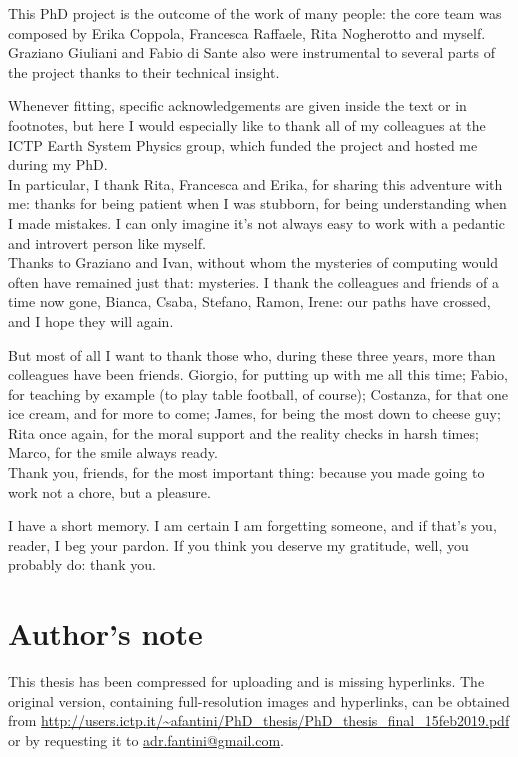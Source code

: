 \begin{acknowledgements}
\addchaptertocentry{\acknowledgementname} %
This PhD project is the outcome of the work of many people: the core team was composed by Erika Coppola, Francesca Raffaele, Rita Nogherotto and myself. Graziano Giuliani and Fabio di Sante also were instrumental to several parts of the project thanks to their technical insight. 

Whenever fitting, specific acknowledgements are given inside the text or in footnotes, but here I would especially like to thank all of my colleagues at the ICTP Earth System Physics group, which funded the project and hosted me during my PhD.\\
In particular, I thank Rita, Francesca and Erika, for sharing this adventure with me: thanks for being patient when I was stubborn, for being understanding when I made mistakes.
I can only imagine it's not always easy to work with a pedantic and introvert person like myself.\\
Thanks to Graziano and Ivan, without whom the mysteries of computing would often have remained just that: mysteries.
I thank the colleagues and friends of a time now gone, Bianca, Csaba, Stefano, Ramon, Irene: our paths have crossed, and I hope they will again.

But most of all I want to thank those who, during these three years, more than colleagues have been friends.
Giorgio, for putting up with me all this time; Fabio, for teaching by example (to play table football, of course); Costanza, for that one ice cream, and for more to come; James, for being the most down to cheese guy; Rita once again, for the moral support and the reality checks in harsh times; Marco, for the smile always ready.\\
Thank you, friends, for the most important thing: because you made going to work not a chore, but a pleasure. 

I have a short memory. I am certain I am forgetting someone, and if that's you, reader, I beg your pardon. If you think you deserve my gratitude, well, you probably do: thank you.

\newpage
\section*{Author's note}
This thesis has been compressed for uploading and is missing hyperlinks.
The original version, containing full-resolution images and hyperlinks, can be obtained from \url{http://users.ictp.it/~afantini/PhD_thesis/PhD_thesis_final_15feb2019.pdf} or by requesting it to \href{mailto:adr.fantini@gmail.com}{adr.fantini@gmail.com}.


\end{acknowledgements}